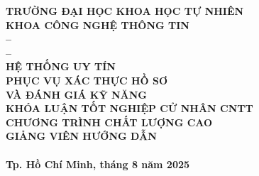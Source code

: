 
\begin{titlepage}
  \begin{center}
    {\large \textbf{TRƯỜNG ĐẠI HỌC KHOA HỌC TỰ NHIÊN}} \\
    \medskip
    {\large \bfseries KHOA CÔNG NGHỆ THÔNG TIN} \\[2.3cm]

    {\Large \bfseries \studentonename{} -- \studentoneid} \\
    {\Large \bfseries \studenttwoname{} -- \studenttwoid} \\[2.3cm]

    {\LARGE \bfseries HỆ THỐNG UY TÍN \\ PHỤC VỤ XÁC THỰC HỒ SƠ \\[3mm] VÀ ĐÁNH GIÁ KỸ NĂNG} \\[2.3cm]

    {\large \bfseries KHÓA LUẬN TỐT NGHIỆP CỬ NHÂN CNTT} \\
    {\large \bfseries CHƯƠNG TRÌNH CHẤT LƯỢNG CAO} \\[2cm]

    {\large \textbf{GIẢNG VIÊN HƯỚNG DẪN}} \\
    \medskip
    {\large \advisorfulltitle} \\

    \vfill
    {\large \bfseries Tp. Hồ Chí Minh, tháng 8 năm 2025}
  \end{center}
\end{titlepage}

\restoregeometry